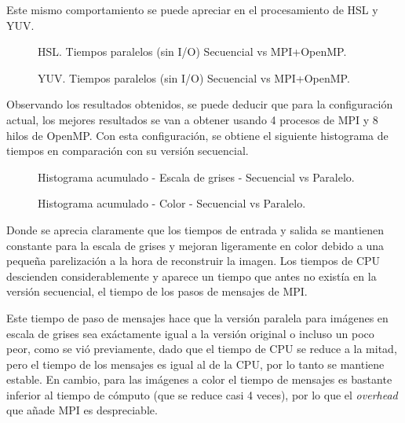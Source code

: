 \documentclass[12pt]{report} %
\begin{document}
Este mismo comportamiento se puede apreciar en el procesamiento de HSL y YUV.

\begin{figure}[H]
	\makebox[\textwidth][c]{
        
    }
    \caption{HSL. Tiempos paralelos (sin I/O) Secuencial vs MPI+OpenMP.}
    \label{fig:hsl_tiempos}
\end{figure}

\begin{figure}[H]
	\makebox[\textwidth][c]{
        
    }
    \caption{YUV. Tiempos paralelos (sin I/O) Secuencial vs MPI+OpenMP.}
    \label{fig:yuv_tiempos}
\end{figure}

Observando los resultados obtenidos, se puede deducir que para la configuración actual, los mejores
resultados se van a obtener usando 4 procesos de MPI y 8 hilos de OpenMP. Con esta configuración, se
obtiene el siguiente histograma de tiempos en comparación con su versión secuencial.

\begin{figure}[H]
	\makebox[\textwidth][c]{
        
    }
    \caption{Histograma acumulado - Escala de grises - Secuencial vs Paralelo.}
    \label{fig:hist_times_grey}
\end{figure}
\begin{figure}[H]
	\makebox[\textwidth][c]{
        
    }
    \caption{Histograma acumulado - Color - Secuencial vs Paralelo.}
    \label{fig:hist_times_color}
\end{figure}

Donde se aprecia claramente que los tiempos de entrada y salida se mantienen constante para la escala de grises y
mejoran ligeramente en color debido a una pequeña parelización a la hora de reconstruir la imagen.
Los tiempos de CPU descienden considerablemente y aparece un tiempo que antes no existía en la versión
secuencial, el tiempo de los pasos de mensajes de MPI.

Este tiempo de paso de mensajes hace que la versión paralela para imágenes en escala de grises sea
exáctamente igual a la versión original o incluso un poco peor, como se vió previamente, dado que el tiempo
de CPU se reduce a la mitad, pero el tiempo de los mensajes es igual al de la CPU, por lo tanto se
mantiene estable. En cambio, para las imágenes a color el tiempo de mensajes es bastante inferior al
tiempo de cómputo (que se reduce casi 4 veces), por lo que el \textit{overhead} que añade MPI es despreciable.
\end{document}
